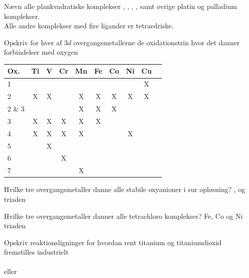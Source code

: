 
\begin{flashcard}[Struktur]{Nævn alle plankvadratiske komplekser}
, , \ce{[Pt(NH3)2Cl2]}, \ce{[Ni(DMG)2]},  samt øvrige platin og palladium komplekser.\\\vspace*{0.5cm}
Alle andre komplekser med fire ligander er tetraedriske.
\end{flashcard}

\begin{flashcard}[Struktur]{Opskriv for hver af $3d$ overgangsmetallerne de oxidationstrin hvor det danner forbindelser med oxygen}
\begin{tabular}{l*{8}{c}r}
Ox.			& Ti & V & Cr & Mn & Fe & Co & Ni & Cu \\
\hline
1			&  &  &  &  &  &  &  & X \\
2			& X & X &  & X & X & X & X & X \\
2 \& 3		&  &  &  & X & X & X &  & \\
3			& X & X & X & X & X &  &  & \\
4			& X & X & X & X &  &  & X & \\
5			&  & X &  &  &  &  &  & \\
6			&  &  & X &  &  &  &  & \\
7			&  &  &  & X &  &  &  & \\
\end{tabular}
\end{flashcard}

\begin{flashcard}[Egenskab]{Hvilke tre overgangsmetaller danne alle stabile oxyanioner i sur opløsning?}
,  og  triaden
\end{flashcard}

\begin{flashcard}[Egenskab]{Hvilke tre overgangsmetaller danner alle tetrachloro komplekser?}
Fe, Co og Ni triaden
\end{flashcard}

\begin{flashcard}[Fremstilling]{Opskriv reaktionsligninger for hvordan rent titanium og titaniumdioxid fremstilles industrielt}
\\\vspace*{0.5cm}
\\
eller\\
\end{flashcard}

